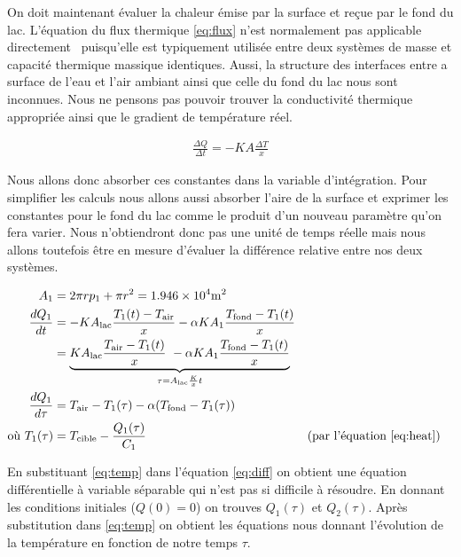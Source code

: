 \documentclass[12pt]{article}
\numberwithin{figure}{section}
\begin{document}
On doit maintenant \'evaluer la chaleur \'emise par la surface et re\c cue par le fond du lac.
L'\'equation du flux thermique \eqref{eq:flux} n'est normalement pas applicable
directement~\cite{HeatFlow} puisqu'elle est typiquement utilis\'ee entre deux syst\`emes de masse et
capacit\'e thermique massique identiques. Aussi, la structure des interfaces entre a surface de
l'eau et l'air ambiant ainsi que celle du fond du lac nous sont inconnues. Nous ne pensons pas
pouvoir trouver la conductivit\'e thermique appropri\'ee ainsi que le gradient de temp\'erature
r\'eel.

\begin{align}
    \frac{\Delta Q}{\Delta t} = -KA\frac{\Delta T}x \label{eq:flux}
\end{align}

Nous allons donc absorber ces constantes dans la variable d'int\'egration. Pour simplifier les
calculs nous allons aussi absorber l'aire de la surface et exprimer les constantes pour le fond du
lac comme le produit d'un nouveau param\`etre qu'on fera varier. Nous n'obtiendront donc pas une
unit\'e de temps r\'eelle mais nous allons toutefois \^etre en mesure d'\'evaluer la diff\'erence
relative entre nos deux syst\`emes.

\begin{align}
    A_1 &= 2\pi r p_1 + \pi r^2 = \num{1.946e4}\si{\square\meter}\notag\\
    \frac{dQ_1}{dt} &=
        -KA_\text{lac}\frac{T_1(t) - T_\text{air}}x -\alpha KA_1\frac{T_\text{fond}-T_1(t)}x\notag\\
    &= \underbrace{KA_\text{lac}\frac{T_\text{air}-T_1(t)}x\
        -\alpha KA_1\frac{T_\text{fond}-T_1(t)}x}_{\tau = A_\text{lac}\frac Kxt}\notag\\
    \frac{dQ_1}{d\tau} &= T_\text{air} - T_1(\tau) - \alpha (T_\text{fond} -
        T_1(\tau))\label{eq:diff}\\
    \text{o\`u } T_1(\tau) &= T_\text{cible} - \frac{Q_1(\tau)}{C_1} \label{eq:temp}&&\text{(par l'\'equation \ref{eq:heat})}
\end{align}

En substituant \eqref{eq:temp} dans l'\'equation \eqref{eq:diff} on obtient une \'equation
diff\'erentielle \`a variable s\'eparable qui n'est pas si difficile \`a r\'esoudre. En donnant les
conditions initiales ($Q(0) = 0$) on trouves $Q_1(\tau)$ et $Q_2(\tau)$. Apr\`es substitution dans
\eqref{eq:temp} on obtient les \'equations nous donnant l'\'evolution de la temp\'erature en fonction
de notre temps $\tau$.
\end{document}
